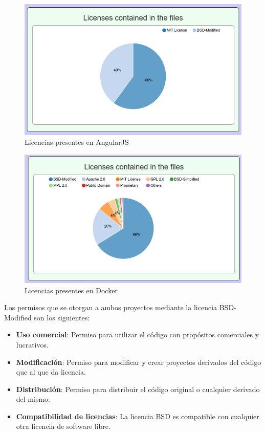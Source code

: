 \documentclass[a4paper, spanish, 12pt]{book}
\begin{document}
\begin{figure}
  \centering
  \includegraphics[width=14cm, keepaspectratio]{img/licenses_angular}
  \caption{Licencias presentes en AngularJS}
  \label{fig:angular_license}
\end{figure}

\begin{figure}
  \centering
  \includegraphics[width=14cm, keepaspectratio]{img/licenses_docker}
  \caption{Licencias presentes en Docker}
  \label{fig:docker_license}
\end{figure}

Los permisos que se otorgan a ambos proyectos mediante la licencia BSD-Modified son los siguientes:

\begin{itemize}
	\item \textbf{Uso comercial}: Permiso para utilizar el c\'odigo con prop\'ositos comerciales y lucrativos.

	\item \textbf{Modificaci\'on}: Permiso para modificar y crear proyectos derivados del c\'odigo que al que da licencia.

	\item \textbf{Distribuci\'on}: Permiso para distribuir el c\'odigo original o cualquier derivado del mismo.

	\item \textbf{Compatibilidad de licencias}: La licencia BSD es compatible con cualquier otra licencia de software libre.
\end{itemize}
\end{document}
